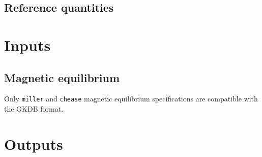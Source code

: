 \documentclass[a4paper]{report}
\begin{document}
\section{Reference quantities}


\chapter{Inputs}
\section{Magnetic equilibrium} \label{sec:magequil}
Only \texttt{miller} and \texttt{chease} magnetic equilibrium specifications are compatible with the GKDB format. 


\chapter{Outputs}



\end{document}
